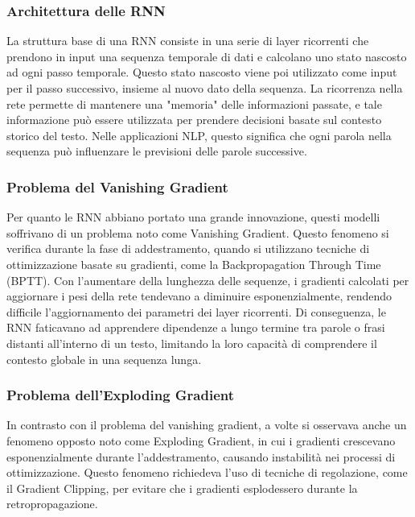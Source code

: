 \subsubsection{Architettura delle RNN}
La struttura base di una RNN consiste in una serie di layer ricorrenti che prendono in input una sequenza temporale di dati e calcolano uno stato nascosto ad ogni passo temporale. Questo stato nascosto viene poi utilizzato come input per il passo successivo, insieme al nuovo dato della sequenza. La ricorrenza nella rete permette di mantenere una "memoria" delle informazioni passate, e tale informazione può essere utilizzata per prendere decisioni basate sul contesto storico del testo. Nelle applicazioni NLP, questo significa che ogni parola nella sequenza può influenzare le previsioni delle parole successive.

\subsubsection{Problema del Vanishing Gradient}
Per quanto le RNN abbiano portato una grande innovazione, questi modelli soffrivano di un problema noto come Vanishing Gradient. Questo fenomeno si verifica durante la fase di addestramento, quando si utilizzano tecniche di ottimizzazione basate su gradienti, come la Backpropagation Through Time (BPTT). Con l'aumentare della lunghezza delle sequenze, i gradienti calcolati per aggiornare i pesi della rete tendevano a diminuire esponenzialmente, rendendo difficile l'aggiornamento dei parametri dei layer ricorrenti. Di conseguenza, le RNN faticavano ad apprendere dipendenze a lungo termine tra parole o frasi distanti all'interno di un testo, limitando la loro capacità di comprendere il contesto globale in una sequenza lunga.

\subsubsection{Problema dell'Exploding Gradient}
In contrasto con il problema del vanishing gradient, a volte si osservava anche un fenomeno opposto noto come Exploding Gradient, in cui i gradienti crescevano esponenzialmente durante l'addestramento, causando instabilità nei processi di ottimizzazione. Questo fenomeno richiedeva l'uso di tecniche di regolazione, come il Gradient Clipping, per evitare che i gradienti esplodessero durante la retropropagazione.

